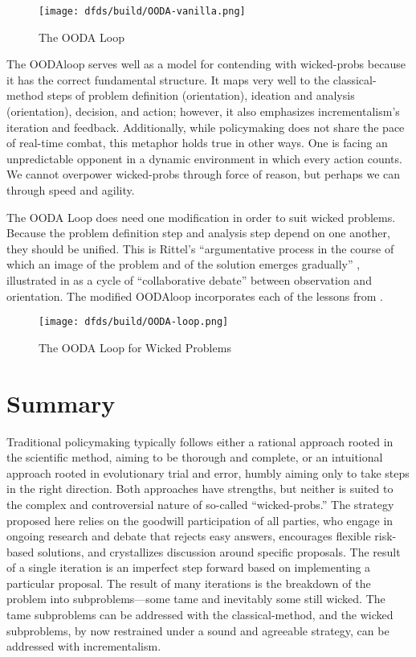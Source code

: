 \begin{figure}[h]
    \centering\CaptionFontSize
    \texttt{[image: dfds/build/OODA-vanilla.png]}
    \caption{The OODA Loop}
    \label{fig-ooda-loop}
\end{figure}

The \ac{OODAloop} serves well as a model for contending with \acp{wicked-prob} because it has the correct fundamental
structure. It maps very well to the \ac{classical-method} steps of problem definition (orientation), ideation and
analysis (orientation), decision, and action; however, it also emphasizes \ac{incrementalism}'s iteration and feedback.
Additionally, while policymaking does not share the pace of real-time combat, this metaphor holds true in other ways.
One is facing an unpredictable opponent in a dynamic environment in which every action counts. We cannot overpower
\acp{wicked-prob} through force of reason, but perhaps we can through speed and agility.

The OODA Loop does need one modification in order to suit wicked problems. Because the problem definition step and
analysis step depend on one another, they should be unified. This is Rittel's ``argumentative process in the course of
which an image of the problem and of the solution emerges gradually'' \cite{rittel_dilemmas_1973}, illustrated in
 as a cycle of ``collaborative debate'' between observation and orientation. The modified
\ac{OODAloop} incorporates each of the lessons from .

\begin{figure}[h]
    \centering\CaptionFontSize
    \texttt{[image: dfds/build/OODA-loop.png]}
    \caption{The OODA Loop for Wicked Problems}
    \label{fig-policy-ooda-loop}
\end{figure}


\section{Summary}

Traditional policymaking typically follows either a rational approach rooted in the scientific method, aiming to be
thorough and complete, or an intuitional approach rooted in evolutionary trial and error, humbly aiming only to take
steps in the right direction. Both approaches have strengths, but neither is suited to the complex and controversial
nature of so-called ``\acp{wicked-prob}.'' The strategy proposed here relies on the goodwill participation of all
parties, who engage in ongoing research and debate that rejects easy answers, encourages flexible risk-based solutions,
and crystallizes discussion around specific proposals. The result of a single iteration is an imperfect step forward
based on implementing a particular proposal. The result of many iterations is the breakdown of the problem into
subproblems---some tame and inevitably some still wicked. The tame subproblems can be addressed with the
\ac{classical-method}, and the wicked subproblems, by now restrained under a sound and agreeable strategy, can be
addressed with \ac{incrementalism}.

